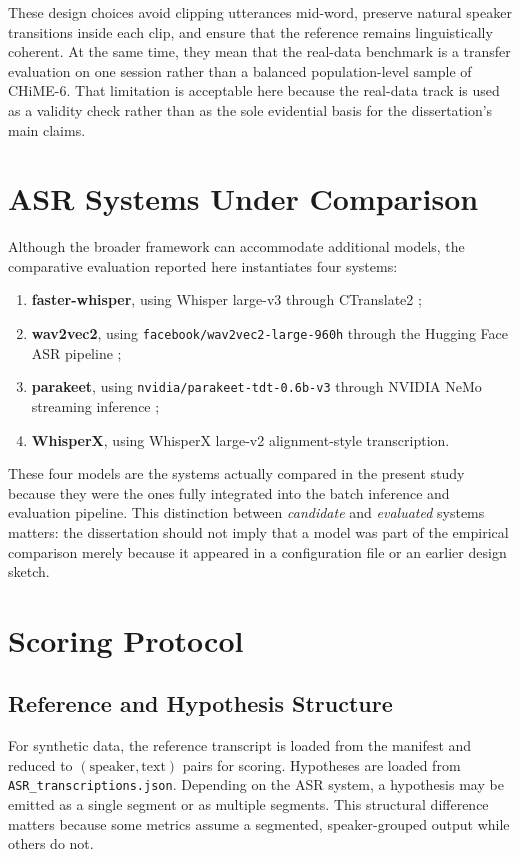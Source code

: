These design choices avoid clipping utterances mid-word, preserve natural speaker transitions inside each clip, and ensure that the reference remains linguistically coherent. At the same time, they mean that the real-data benchmark is a transfer evaluation on one session rather than a balanced population-level sample of CHiME-6. That limitation is acceptable here because the real-data track is used as a validity check rather than as the sole evidential basis for the dissertation's main claims.

\section{ASR Systems Under Comparison}
Although the broader framework can accommodate additional models, the comparative evaluation reported here instantiates four systems:
\begin{enumerate}[leftmargin=*]
    \item \textbf{faster-whisper}, using Whisper large-v3 through CTranslate2 \citep{github_openai_faster-whisper, radford2022robustspeechrecognitionlargescale};
    \item \textbf{wav2vec2}, using \texttt{facebook/wav2vec2-large-960h} through the Hugging Face ASR pipeline \citep{facebook_wav2vec2-large-960h, baevski2020wav2vec20frameworkselfsupervised};
    \item \textbf{parakeet}, using \texttt{nvidia/parakeet-tdt-0.6b-v3} through NVIDIA NeMo streaming inference \citep{nvidia/parakeet-tdt-0.6b-v3, sekoyan2025canary1bv2parakeettdt06bv3efficient};
    \item \textbf{WhisperX}, using WhisperX large-v2 alignment-style transcription.
\end{enumerate}

These four models are the systems actually compared in the present study because they were the ones fully integrated into the batch inference and evaluation pipeline. This distinction between \emph{candidate} and \emph{evaluated} systems matters: the dissertation should not imply that a model was part of the empirical comparison merely because it appeared in a configuration file or an earlier design sketch.

\section{Scoring Protocol}
\subsection{Reference and Hypothesis Structure}
For synthetic data, the reference transcript is loaded from the manifest and reduced to \((\text{speaker}, \text{text})\) pairs for scoring. Hypotheses are loaded from \texttt{ASR\_transcriptions.json}. Depending on the ASR system, a hypothesis may be emitted as a single segment or as multiple segments. This structural difference matters because some metrics assume a segmented, speaker-grouped output while others do not.

